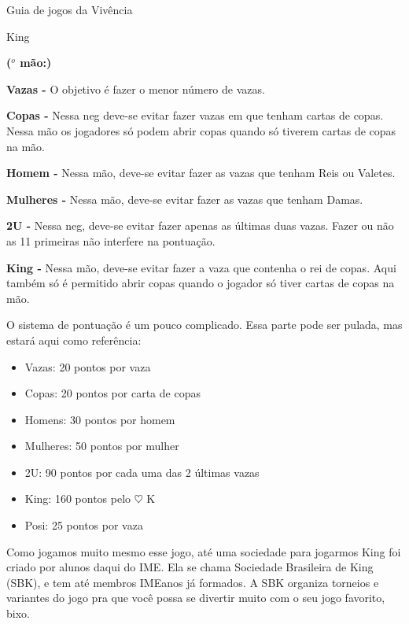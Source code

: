 \begin{secao}{Guia de jogos da Vivência }
\begin{subsecao}{King}
\begin{list}{\textbf{ ($^{o}$ mão:)}}{}

\item \textbf{Vazas -} O objetivo é fazer o menor número de vazas.

\item \textbf{Copas -}  Nessa neg deve-se evitar fazer vazas em que tenham cartas de copas. Nessa mão os jogadores só podem abrir copas quando só tiverem cartas de copas na mão.

\item \textbf{Homem -} Nessa mão, deve-se evitar fazer as vazas que tenham Reis ou Valetes.

\item \textbf{Mulheres -} Nessa mão, deve-se evitar fazer as vazas que tenham Damas.

\item \textbf{2U -} Nessa neg, deve-se evitar fazer apenas as últimas duas vazas. Fazer ou não as 11 primeiras não interfere na pontuação.

\item \textbf{King -} Nessa mão, deve-se evitar fazer a vaza que contenha o rei de copas. Aqui também só é permitido abrir copas quando o jogador só tiver cartas de copas na mão.

\end{list}

O sistema de pontuação é um pouco complicado. Essa parte pode ser pulada, mas estará aqui como referência:
\begin{itemize}

\item Vazas:	  20 pontos por vaza
\item Copas:	  20 pontos por carta de copas
\item Homens:	  30 pontos por homem
\item Mulheres: 50 pontos por mulher
\item 2U:	  90 pontos por cada uma das 2 últimas vazas
\item King:    160 pontos pelo $\heartsuit$ K
\item Posi:	  25 pontos por vaza

\end{itemize}
Como jogamos muito mesmo esse jogo, até uma sociedade para jogarmos King foi criado por alunos daqui do IME. Ela se chama Sociedade Brasileira de King (SBK), e tem até membros IMEanos já formados. A SBK organiza torneios e variantes do jogo pra que você possa se divertir muito com o seu jogo favorito, bixo.


\end{subsecao}
\end{secao}
